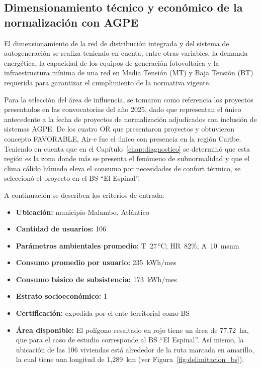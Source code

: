 \subsection{Dimensionamiento técnico y económico de la normalización con AGPE}
\label{subsec:dimensionamiento_caso}

El dimensionamiento de la red de distribución integrada y del sistema de autogeneración se realiza teniendo en cuenta, entre otras variables, la demanda energética, la capacidad de los equipos de generación fotovoltaica y la infraestructura mínima de una red en Media Tensión (MT) y Baja Tensión (BT) requerida para garantizar el cumplimiento de la normativa vigente.

Para la selección del área de influencia, se tomaron como referencia los proyectos presentados en las convocatorias del año 2025, dado que representan el único antecedente a la fecha de proyectos de normalización adjudicados con inclusión de sistemas AGPE. De los cuatro OR que presentaron proyectos y obtuvieron concepto FAVORABLE, Air-e fue el único con presencia en la región Caribe. Teniendo en cuenta que en el Capítulo~\ref{chap:diagnostico} se determinó que esta región es la zona donde más se presenta el fenómeno de subnormalidad y que el clima cálido húmedo eleva el consumo por necesidades de confort térmico, se seleccionó el proyecto en el BS ``El Espinal''.

A continuación se describen los criterios de entrada:

\begin{itemize}
    \item \textbf{Ubicación:} municipio Malambo, Atlántico
    \item \textbf{Cantidad de usuarios:} 106
    \item \textbf{Parámetros ambientales promedio:} T~27\,°C; HR~82\%; A~10~msnm
    \item \textbf{Consumo promedio por usuario:} 235~kWh/mes
    \item \textbf{Consumo básico de subsistencia:} 173~kWh/mes
    \item \textbf{Estrato socioeconómico:} 1
    \item \textbf{Certificación:} expedida por el ente territorial como BS
    \item \textbf{Área disponible:} El polígono resaltado en rojo tiene un área de 77,72~ha, que para el caso de estudio corresponde al BS ``El Espinal''. Así mismo, la ubicación de las 106 viviendas está alrededor de la ruta marcada en amarillo, la cual tiene una longitud de 1,289~km (ver Figura~\ref{fig:delimitacion_bs}).
\end{itemize}

